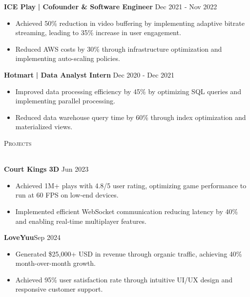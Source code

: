\documentclass[a4paper]{article}
\newcommand{\lineunder}{
    \vspace*{-8pt} \\
    \hspace*{-18pt} \hrulefill \\
}
\newcommand{\header}[1]{
    {\hspace*{-18pt}\vspace*{6pt} \textsc{#1}}
    \vspace*{-6pt} \lineunder
}
\begin{document}
    \textbf{ICE Play}\textbf{ | Cofounder \& Software Engineer} \hfill  Dec 2021 - Nov 2022\\
    \vspace{-3mm}
    \begin{itemize} \itemsep -3pt
        \item Achieved 50\% reduction in video buffering by implementing adaptive bitrate streaming, leading to 35\% increase in user engagement.
        \item Reduced AWS costs by 30\% through infrastructure optimization and implementing auto-scaling policies.
    \end{itemize}

    \textbf{Hotmart}\textbf{ | Data Analyst Intern} \hfill  Dec 2020 - Dec 2021\\
    \vspace{-3mm}
    \begin{itemize} \itemsep -3pt
        \item Improved data processing efficiency by 45\% by optimizing SQL queries and implementing parallel processing.
        \item Reduced data warehouse query time by 60\% through index optimization and materialized views.
    \end{itemize}

    \header{Projects}
    \vspace{2mm}

    \textbf{Court Kings 3D} \hfill  Jun 2023\\
    \vspace{-3mm}
    \begin{itemize} \itemsep -3pt
        \item Achieved 1M+ plays with 4.8/5 user rating, optimizing game performance to run at 60 FPS on low-end devices.
        \item Implemented efficient WebSocket communication reducing latency by 40\% and enabling real-time multiplayer features.
    \end{itemize}

    \textbf{LoveYuu}\hfill  Sep 2024\\
    \vspace{-3mm}
    \begin{itemize} \itemsep -3pt
        \item Generated \$25,000+ USD in revenue through organic traffic, achieving 40\% month-over-month growth.
        \item Achieved 95\% user satisfaction rate through intuitive UI/UX design and responsive customer support.
    \end{itemize}
\end{document}

